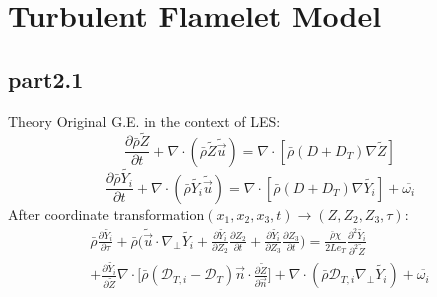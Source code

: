 \section{Turbulent Flamelet Model}
	\subsection{part2.1}
		\begin{xframe}{Theory}
			Original G.E. in the context of LES:
			\begin{equation}
				\frac{\partial \bar{\rho}\tilde{Z}}{\partial t} + \nabla \cdot (\bar{\rho} \tilde{Z}\tilde{\vec{u}}) = \nabla \cdot [\bar{\rho}(D+D_T)\nabla\tilde{Z}]
			\end{equation}
			\begin{equation}
				\frac{\partial \bar{\rho}\tilde{Y_i}}{\partial t} + \nabla \cdot (\bar{\rho} \tilde{Y_i}\tilde{\vec{u}}) = \nabla \cdot [\bar{\rho}(D+D_T)\nabla\tilde{Y_i}] + \overline{\omega_i}
			\end{equation}
			\pause
			After coordinate transformation$(x_1,x_2,x_3,t)\rightarrow(Z,Z_2,Z_3,\tau)$:
			\begin{equation}
				\begin{split}
					\bar{\rho}\frac{\partial \tilde{Y_i}}{\partial \tau} + \bar{\rho} \Big(\tilde{\vec{u}} \cdot \nabla_\perp \tilde{Y_i} + \frac{\partial \tilde{Y_i}}{\partial Z_2}\frac{\partial Z_2}{\partial t} + \frac{\partial \tilde{Y_i}}{\partial Z_3}\frac{\partial Z_3}{\partial t}\Big) = \frac{\bar{\rho}\chi}{2Le_T}\frac{\partial^2 \tilde{Y_i}}{\partial^2 \tilde{Z}}\\ + \frac{\partial \tilde{Y_i}}{\partial \tilde{Z}}\nabla\cdot\Bigg[\bar{\rho}(\mathcal{D}_{T,i}-\mathcal{D}_T)\vec{n}\cdot\frac{\partial \tilde{Z}}{\partial \vec{n}}\Bigg] + \nabla \cdot (\bar{\rho}\mathcal{D}_{T,i}\nabla_\perp\tilde{Y_i}) + \overline{\omega_i}
				\end{split}	
			\end{equation}
		\end{xframe}
